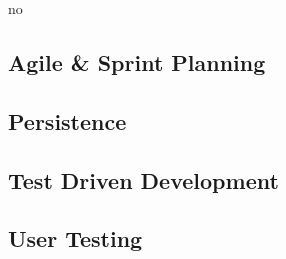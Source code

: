 no\documentclass{article}
\begin{document}
\subsection{Agile \& Sprint Planning}

\subsection{Persistence}

\subsection{Test Driven Development}

\subsection{User Testing}
\end{document}
